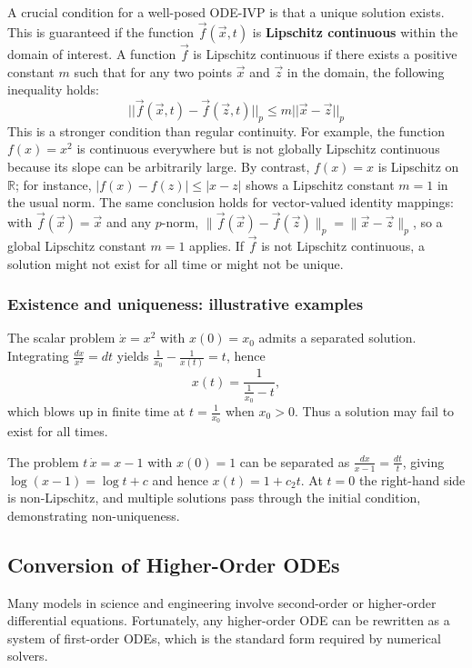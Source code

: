 A crucial condition for a well-posed ODE-IVP is that a unique solution exists. This is guaranteed if the function $\vec{f}(\vec{x},t)$ is \textbf{Lipschitz continuous} within the domain of interest. A function $\vec{f}$ is Lipschitz continuous if there exists a positive constant $m$ such that for any two points $\vec{x}$ and $\vec{z}$ in the domain, the following inequality holds:
\begin{equation}
    ||\vec{f}(\vec{x},t) - \vec{f}(\vec{z},t)||_p \le m||\vec{x}-\vec{z}||_p
    \label{eq:lipschitz}
\end{equation}
This is a stronger condition than regular continuity. For example, the function $f(x)=x^2$ is continuous everywhere but is not globally Lipschitz continuous because its slope can be arbitrarily large. By contrast, $f(x)=x$ is Lipschitz on $\mathbb{R}$; for instance, $|f(x)-f(z)|\le |x-z|$ shows a Lipschitz constant $m=1$ in the usual norm. The same conclusion holds for vector-valued identity mappings: with $\vec{f}(\vec{x})=\vec{x}$ and any $p$-norm, $\|\vec{f}(\vec{x})-\vec{f}(\vec{z})\|_p=\|\vec{x}-\vec{z}\|_p$, so a global Lipschitz constant $m=1$ applies. If $\vec{f}$ is not Lipschitz continuous, a solution might not exist for all time or might not be unique.

\subsubsection{Existence and uniqueness: illustrative examples}
The scalar problem $\dot{x} = x^2$ with $x(0)=x_0$ admits a separated solution. Integrating $\tfrac{dx}{x^2}=dt$ yields $\tfrac{1}{x_0}-\tfrac{1}{x(t)}=t$, hence
\begin{equation}
    x(t) = \frac{1}{\tfrac{1}{x_0}-t},
\end{equation}
which blows up in finite time at $t=\tfrac{1}{x_0}$ when $x_0>0$. Thus a solution may fail to exist for all times.

The problem $t\,\dot{x}=x-1$ with $x(0)=1$ can be separated as $\tfrac{dx}{x-1}=\tfrac{dt}{t}$, giving $\log(x-1)=\log t + c$ and hence $x(t)=1+c_2 t$. At $t=0$ the right-hand side is non-Lipschitz, and multiple solutions pass through the initial condition, demonstrating non-uniqueness.

\subsection{Conversion of Higher-Order ODEs}
\label{subsec:ivp-higher-order}
Many models in science and engineering involve second-order or higher-order differential equations. Fortunately, any higher-order ODE can be rewritten as a system of first-order ODEs, which is the standard form required by numerical solvers.

